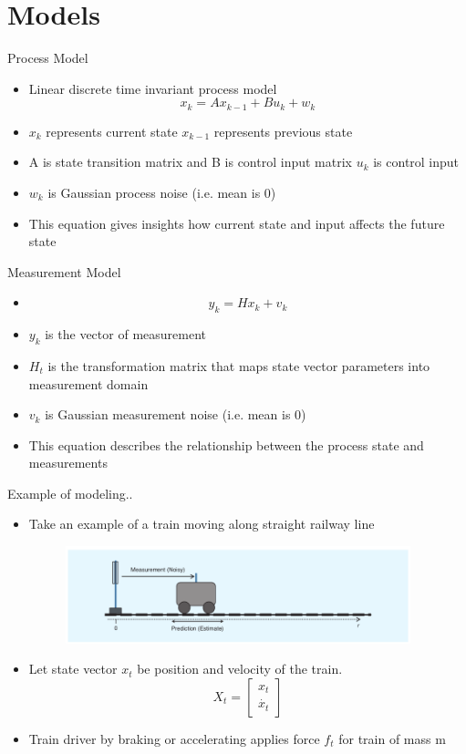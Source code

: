 \documentclass{beamer}
\begin{document}
\section{Models}
\begin{frame}{Process Model}
\begin{itemize}
  \item Linear discrete time invariant process model \[ x_k = Ax_{k-1} + Bu_k + w_{k} \]
  \item \(x_k\) represents current state  \(x_{k-1}\) represents previous state
  \item A is state transition matrix and B is control input matrix \(u_k\) is control input
  \item \(w_{k}\) is Gaussian process noise (i.e. mean is 0)
  \item This equation gives insights how current state and input affects the future state
\end{itemize}
\vskip 1cm
\end{frame}
\begin{frame}{Measurement Model}
\begin{itemize}
  \item \[ y_k = Hx_{k} + v_k \]
  \item \(y_k\) is the vector of measurement
  \item \(H_t\) is the transformation matrix that maps state vector parameters into measurement domain
  \item \(v_{k}\) is Gaussian measurement noise (i.e. mean is 0)
  \item This equation describes the relationship between the process state and measurements
\end{itemize}
\vskip 1cm
\end{frame}
\begin{frame}{Example of modeling..}
\begin{itemize}
  \item Take an example of a train moving along straight railway line
  \begin{figure} [ht!]
    \includegraphics[width=100mm]{images/train0.png}
  \end{figure}
  \item Let state vector \(x_t\) be position and velocity of the train.
    \[
      X_t = \begin{bmatrix} x_t \\ \dot{x_t} \end{bmatrix}
    \]
  \item Train driver by braking or accelerating applies force \(f_t\) for train of mass m
\end{itemize}
\vskip 1cm
\end{frame}
\end{document}
